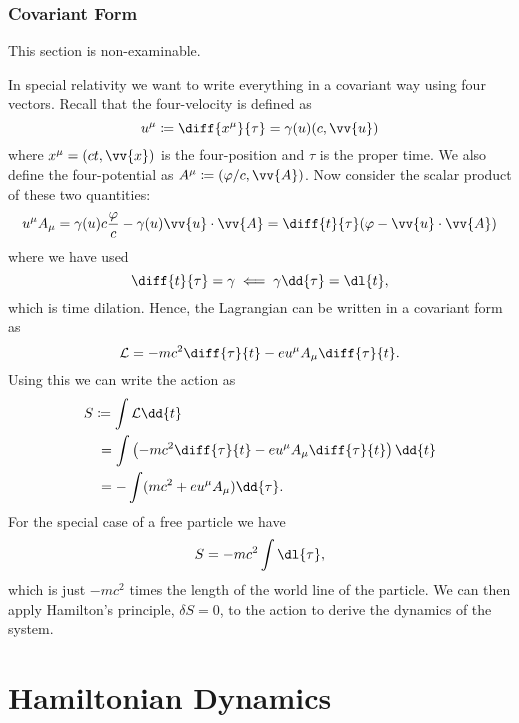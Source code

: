 \documentclass[fleqn]{NotesClass}
\newcommand*{\lagrangian}{\mathcal{L}}
\begin{document}
    \subsection{Covariant Form}
    \begin{rmk}
        This section is non-examinable.
    \end{rmk}
    
    In special relativity we want to write everything in a covariant way using four vectors.
    Recall that the four-velocity is defined as
    \begin{equation}
        u^\mu \coloneqq \diff{x^\mu}{\tau} = \gamma(u)(c, \vv{u})
    \end{equation}
    where \(x^\mu = (ct, \vv{x})\) is the four-position and \(\tau\) is the proper time.
    We also define the four-potential as \(A^\mu \coloneqq (\varphi/c, \vv{A})\).
    Now consider the scalar product of these two quantities:
    \begin{align}
        u^\mu A_\mu = \gamma(u)c\frac{\varphi}{c} - \gamma(u)\vv{u}\cdot\vv{A} = \diff{t}{\tau}(\varphi - \vv{u}\cdot\vv{A})
    \end{align}
    where we have used
    \begin{equation}
        \diff{t}{\tau} = \gamma \impliedby \gamma\dd{\tau} = \dl{t},
    \end{equation}
    which is time dilation.
    Hence, the Lagrangian can be written in a covariant form as
    \begin{equation}
        \lagrangian = -mc^2\diff{\tau}{t} - eu^\mu A_\mu \diff{\tau}{t}.
    \end{equation}
    Using this we can write the action as
    \begin{align}
        S &\coloneqq \int \lagrangian \dd{t}\\
        &\hphantom{:}= \int \left( -mc^2\diff{\tau}{t} - eu^\mu A_\mu \diff{\tau}{t} \right)\dd{t}\\
        &\hphantom{:}= -\int (mc^2 + eu^\mu A_\mu) \dd{\tau}.
    \end{align}
    For the special case of a free particle we have
    \begin{equation}
        S = -mc^2 \int \dl{\tau},
    \end{equation}
    which is just \(-mc^2\) times the length of the world line of the particle.
    We can then apply Hamilton's principle, \(\delta S = 0\), to the action to derive the dynamics of the system.
    
    \chapter{Hamiltonian Dynamics}
\end{document}
